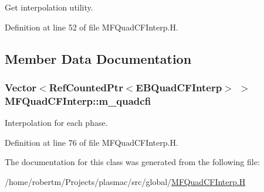 Get interpolation utility. 



Definition at line 52 of file M\+F\+Quad\+C\+F\+Interp.\+H.



\subsection{Member Data Documentation}
\subsubsection[{\texorpdfstring{m\+\_\+quadcfi}{m_quadcfi}}]{\setlength{\rightskip}{0pt plus 5cm}Vector$<$Ref\+Counted\+Ptr$<$E\+B\+Quad\+C\+F\+Interp$>$ $>$ M\+F\+Quad\+C\+F\+Interp\+::m\+\_\+quadcfi\hspace{0.3cm}{\ttfamily [protected]}}\hypertarget{classMFQuadCFInterp_a7f778e3c58dc248231b0a01f715127e6}{}\label{classMFQuadCFInterp_a7f778e3c58dc248231b0a01f715127e6}


Interpolation for each phase. 



Definition at line 76 of file M\+F\+Quad\+C\+F\+Interp.\+H.



The documentation for this class was generated from the following file\+:\begin{DoxyCompactItemize}
\item 
/home/robertm/\+Projects/plasmac/src/global/\hyperlink{MFQuadCFInterp_8H}{M\+F\+Quad\+C\+F\+Interp.\+H}\end{DoxyCompactItemize}
